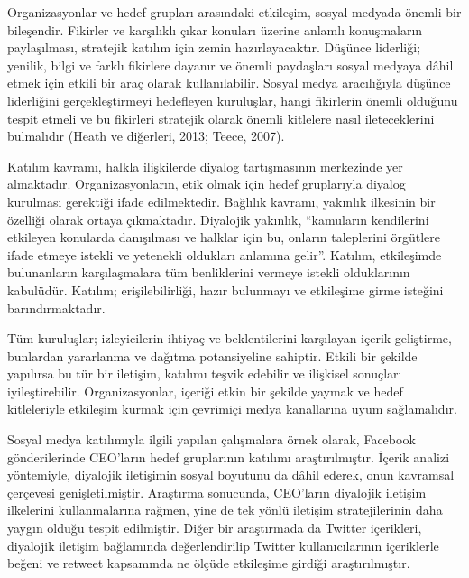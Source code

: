 \documentclass[
]{book}
\begin{document}
Organizasyonlar ve hedef grupları arasındaki etkileşim, sosyal medyada önemli bir bileşendir. \citep{rybalko2010dialogic} Fikirler ve karşılıklı çıkar konuları üzerine anlamlı konuşmaların paylaşılması, stratejik katılım için zemin hazırlayacaktır. Düşünce liderliği; yenilik, bilgi ve farklı fikirlere dayanır \citep{mccrimmon2005thought} ve önemli paydaşları sosyal medyaya dâhil etmek için etkili bir araç olarak kullanılabilir. Sosyal medya aracılığıyla düşünce liderliğini gerçekleştirmeyi hedefleyen kuruluşlar, hangi fikirlerin önemli olduğunu tespit etmeli ve bu fikirleri stratejik olarak önemli kitlelere nasıl ileteceklerini bulmalıdır (Heath ve diğerleri, 2013; Teece, 2007).

Katılım kavramı, halkla ilişkilerde diyalog tartışmasının merkezinde yer almaktadır. Organizasyonların, etik olmak için hedef gruplarıyla diyalog kurulması gerektiği ifade edilmektedir. Bağlılık kavramı, yakınlık ilkesinin bir özelliği olarak ortaya çıkmaktadır. \citep{kent2002toward} Diyalojik yakınlık, ``kamuların kendilerini etkileyen konularda danışılması ve halklar için bu, onların taleplerini örgütlere ifade etmeye istekli ve yetenekli oldukları anlamına gelir''. Katılım, etkileşimde bulunanların karşılaşmalara tüm benliklerini vermeye istekli olduklarının kabulüdür. Katılım; erişilebilirliği, hazır bulunmayı ve etkileşime girme isteğini barındırmaktadır. \citep{taylor2014dialogic}

Tüm kuruluşlar; izleyicilerin ihtiyaç ve beklentilerini karşılayan içerik geliştirme, bunlardan yararlanma ve dağıtma potansiyeline sahiptir. Etkili bir şekilde yapılırsa bu tür bir iletişim, katılımı teşvik edebilir ve ilişkisel sonuçları iyileştirebilir. \citep{mersey2010engagement} Organizasyonlar, içeriği etkin bir şekilde yaymak ve hedef kitleleriyle etkileşim kurmak için çevrimiçi medya kanallarına uyum sağlamalıdır.

Sosyal medya katılımıyla ilgili yapılan çalışmalara örnek olarak, Facebook gönderilerinde CEO'ların hedef gruplarının katılımı araştırılmıştır. İçerik analizi yöntemiyle, diyalojik iletişimin sosyal boyutunu da dâhil ederek, onun kavramsal çerçevesi genişletilmiştir. Araştırma sonucunda, CEO'ların diyalojik iletişim ilkelerini kullanmalarına rağmen, yine de tek yönlü iletişim stratejilerinin daha yaygın olduğu tespit edilmiştir. \citep{men2018social} Diğer bir araştırmada da Twitter içerikleri, diyalojik iletişim bağlamında değerlendirilip Twitter kullanıcılarının içeriklerle beğeni ve retweet kapsamında ne ölçüde etkileşime girdiği araştırılmıştır. \citep{wang2020dialogic}
\end{document}
